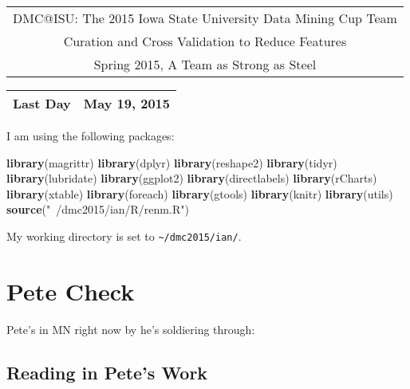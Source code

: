 \documentclass[10pt]{report}
\newenvironment{Shaded}{}{}
\newcommand{\KeywordTok}[1]{\textcolor[rgb]{0.00,0.44,0.13}{\textbf{{#1}}}}
\newcommand{\StringTok}[1]{\textcolor[rgb]{0.25,0.44,0.63}{{#1}}}
\newcommand{\NormalTok}[1]{{#1}}
\begin{document}
\thispagestyle{empty}%
\begin{center}%
    \renewcommand{\arraystretch}{1.5}%
    \begin{tabular}{c}%
       \Large{DMC@ISU: The 2015 Iowa State University Data Mining Cup Team}\\
       Curation and Cross Validation to Reduce Features\\
       Spring 2015, A Team as Strong as Steel \\
    \end{tabular}
\end{center}

\begin{center}
 \renewcommand{\arraystretch}{1.5}
 \begin{tabular*}{0.65\textwidth}{r@{:\hspace{.3cm}}l}
    \hline
    
    
    Last Day&  May 19, 2015\\
    \hline
 \end{tabular*}
\end{center}

I am using the following packages:

\begin{Shaded}
\begin{Highlighting}[]
   \KeywordTok{library}\NormalTok{(magrittr)}
   \KeywordTok{library}\NormalTok{(dplyr)}
   \KeywordTok{library}\NormalTok{(reshape2)}
   \KeywordTok{library}\NormalTok{(tidyr)}
   \KeywordTok{library}\NormalTok{(lubridate)}
   \KeywordTok{library}\NormalTok{(ggplot2)}
   \KeywordTok{library}\NormalTok{(directlabels)}
   \KeywordTok{library}\NormalTok{(rCharts)}
   \KeywordTok{library}\NormalTok{(xtable)}
   \KeywordTok{library}\NormalTok{(foreach)}
   \KeywordTok{library}\NormalTok{(gtools)}
   \KeywordTok{library}\NormalTok{(knitr)}
   \KeywordTok{library}\NormalTok{(utils)}
   \KeywordTok{source}\NormalTok{(}\StringTok{"~/dmc2015/ian/R/renm.R"}\NormalTok{)}
\end{Highlighting}
\end{Shaded}

My working directory is set to \verb!~/dmc2015/ian/!.

\section{Pete Check}\label{pete-check}

Pete's in MN right now by he's soldiering through:

\subsection{Reading in Pete's Work}\label{reading-in-petes-work}
\end{document}
